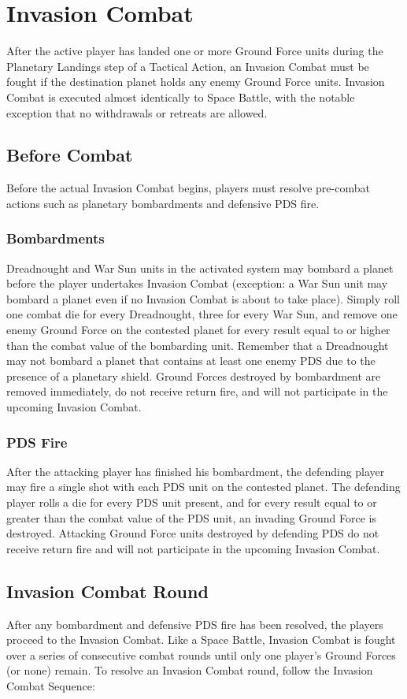 \documentclass[11pt,fleqn]{book} %
\begin{document}
\section{Invasion Combat}
After the active player has landed one or more Ground Force units during the Planetary Landings step of a Tactical Action, an Invasion Combat must be fought if the destination planet holds any enemy Ground Force units. Invasion Combat is executed almost identically to Space Battle, with the notable exception that no withdrawals or retreats are allowed.

\subsection{Before Combat}
Before the actual Invasion Combat begins, players must resolve pre-combat actions such as planetary bombardments and defensive PDS fire.

\subsubsection{Bombardments}
Dreadnought and War Sun units in the activated system may bombard a planet before the player undertakes Invasion Combat (exception: a War Sun unit may bombard a planet even if no Invasion Combat is about to take place). Simply roll one combat die for every Dreadnought, three for every War Sun, and remove one enemy Ground Force on the contested planet for every result equal to or higher than the combat value of the bombarding unit. Remember that a Dreadnought may not bombard a planet that contains at least one enemy PDS due to the presence of a planetary shield. Ground Forces destroyed by bombardment are removed immediately, do not receive return fire, and will not participate in the upcoming Invasion Combat.

\subsubsection{PDS Fire}
After the attacking player has finished his bombardment, the defending player may fire a single shot with each PDS unit on the contested planet. The defending player rolls a die for every PDS unit present, and for every result equal to or greater than the combat value of the PDS unit, an invading Ground Force is destroyed. Attacking Ground Force units destroyed by defending PDS do not receive return fire and will not participate in the upcoming Invasion Combat.

\subsection{Invasion Combat Round}
After any bombardment and defensive PDS fire has been resolved, the players proceed to the Invasion
Combat. Like a Space Battle, Invasion Combat is fought over a series of consecutive combat rounds until only one player's Ground Forces (or none) remain. To resolve an Invasion Combat round, follow the Invasion Combat Sequence:
\end{document}
